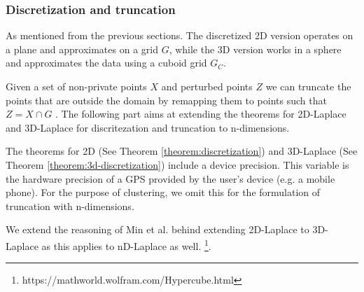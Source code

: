 \subsubsection{Discretization and truncation} \label{theory:nd-laplace-truncation}
As mentioned from the previous sections. The discretized 2D version operates on a plane and approximates on a grid $G$, while the 3D version works in a sphere and approximates the data using a cuboid grid  $G_C$.

Given a set of non-private points $X$ and perturbed points $Z$ we can truncate the points that are outside the domain by remapping them to points such that $Z = X \cap G$ \citep{DBLP:journals/corr/abs-1212-1984}.
The following part aims at extending the theorems for 2D-Laplace and 3D-Laplace for discritezation and truncation to n-dimensions. \newline

The theorems for 2D (See Theorem \ref{theorem:discretization}) and 3D-Laplace (See Theorem \ref{theorem:3d-discretization}) include a device precision. 
This variable is the hardware precision of a GPS provided by the user's device (e.g. a mobile phone). 
For the purpose of clustering, we omit this for the formulation of truncation with n-dimensions. \newline

We extend the reasoning of Min et al. behind extending 2D-Laplace to 3D-Laplace as this applies to nD-Laplace as well.
 \footnote{https://mathworld.wolfram.com/Hypercube.html}.


